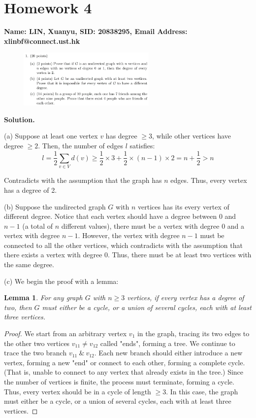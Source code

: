 \documentclass[10pt]{article}
\newtheorem*{lemma}{Lemma}
\begin{document}
\newpage

\section*{Homework 4}

\textbf{Name: LIN, Xuanyu, SID: 20838295, Email Address: xlinbf@connect.ust.hk}

\begin{figure}[h]
	\centering
	\includegraphics[width=0.6\textwidth]{hw4-1}
\end{figure}

\textbf{Solution.}

(a) Suppose at least one vertex $v$ has degree $\geq 3$, while other vertices have degree $\geq 2$. Then, the number of edges $l$ satisfies:
\[
	l = \frac{1}{2} \sum_{v\in V} d(v) \geq \frac{1}{2} \times 3 + \frac{1}{2} \times (n-1) \times 2 = n + \frac{1}{2} > n
\]

Contradicts with the assumption that the graph has $n$ edges. Thus, every vertex has a degree of 2.

\vspace*{1em}

(b) Suppose the undirected graph $G$ with $n$ vertices has its every vertex of different degree. Notice that each vertex should have a degree between 0 and $n-1$ (a total of $n$ different values), there must be a vertex with degree 0 and a vertex with degree $n-1$. However, the vertex with degree $n-1$ must be connected to all the other vertices, which contradicts with the assumption that there exists a vertex with degree 0. Thus, there must be at least two vertices with the same degree.

\vspace*{1em}

(c) We begin the proof with a lemma:
\begin{lemma}
	For any graph $G$ with $n \geq 3$ vertices, if every vertex has a degree of two, then $G$ must either be a cycle, or a union of several cycles, each with at least three vertices.
\end{lemma}
\begin{proof}
	We start from an arbitrary vertex $v_1$ in the graph, tracing its two edges to the other two vertices $v_{11}\neq v_{12}$ called "ends", forming a tree. We continue to trace the two branch $v_{11}\ \&\ v_{12}$. Each new branch should either introduce a new vertex, forming a new "end" or connect to each other, forming a complete cycle. (That is, unable to connect to any vertex that already exists in the tree.) Since the number of vertices is finite, the process must terminate, forming a cycle. Thus, every vertex should be in a cycle of length $\geq 3$. In this case, the graph must either be a cycle, or a union of several cycles, each with at least three vertices.
\end{proof}
\end{document}
